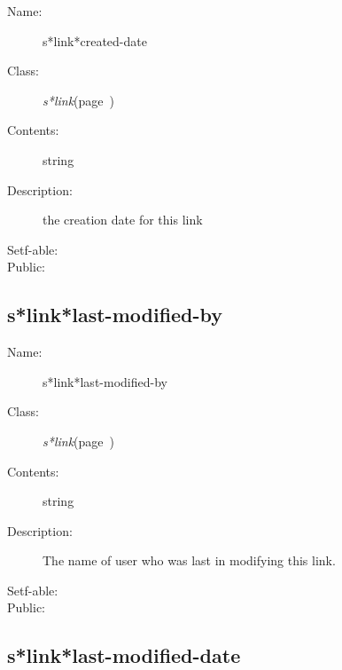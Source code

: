 \begin{description}

\item [Name:]  s*link*created-date

\item [Class:] {\sl s*link}\hfill(page~\pageref{s*link})

\item [Contents:] string

\item [Description:] 
the creation date for this link

\item [Setf-able:]

\item [Public:]



\end{description}
\horizontalline

\subsection{s*link*last-modified-by}
\label{s*link*last-modified-by}

\begin{description}

\item [Name:]  s*link*last-modified-by

\item [Class:] {\sl s*link}\hfill(page~\pageref{s*link})

\item [Contents:] string

\item [Description:] 
The name of user who was last in modifying this
link.

\item [Setf-able:]

\item [Public:]



\end{description}
\horizontalline

\subsection{s*link*last-modified-date}
\label{s*link*last-modified-date}

